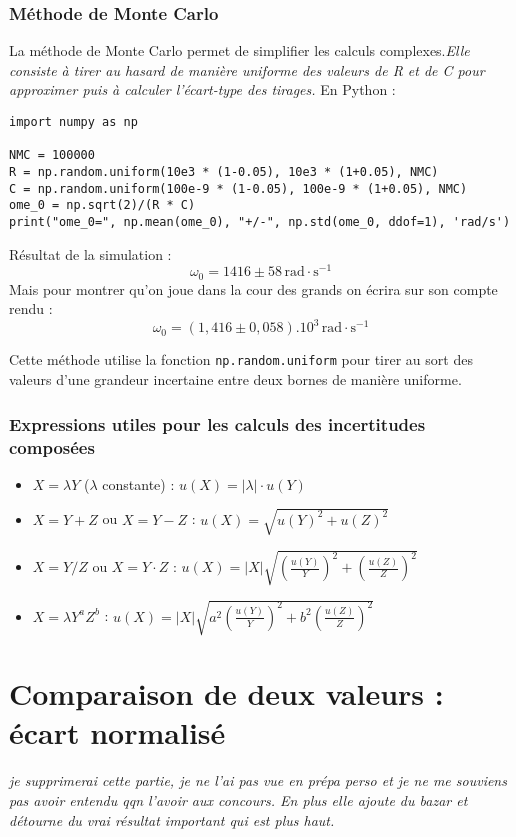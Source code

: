 \documentclass[10pt]{article}
\begin{document}
\begin{multicols}{2}
\subsubsection{Méthode de Monte Carlo}

La méthode de Monte Carlo permet de simplifier les calculs complexes.\textit{Elle consiste à tirer au hasard de manière uniforme des valeurs de R et de C pour approximer puis à calculer l'écart-type des tirages.} En Python :

\begin{verbatim}
import numpy as np

NMC = 100000
R = np.random.uniform(10e3 * (1-0.05), 10e3 * (1+0.05), NMC)
C = np.random.uniform(100e-9 * (1-0.05), 100e-9 * (1+0.05), NMC)
ome_0 = np.sqrt(2)/(R * C)
print("ome_0=", np.mean(ome_0), "+/-", np.std(ome_0, ddof=1), 'rad/s')
\end{verbatim}

Résultat de la simulation :
\[
\omega_0 = 1416 \pm 58 \, \text{rad} \cdot \text{s}^{-1}
\]
Mais pour montrer qu'on joue dans la cour des grands on écrira sur son compte rendu :
\[
\omega_0 = (1,416 \pm 0,058) . 10^3 \, \text{rad} \cdot \text{s}^{-1}
\]

Cette méthode utilise la fonction \texttt{np.random.uniform} pour tirer au sort des valeurs d’une grandeur incertaine entre deux bornes de manière uniforme.

\subsubsection{Expressions utiles pour les calculs des incertitudes composées}

\begin{itemize}
    \item \(X = \lambda Y\) (\(\lambda\) constante) : \(u(X) = |\lambda| \cdot u(Y)\)
    \item \(X = Y + Z\) ou \(X = Y - Z\) : \(u(X) = \sqrt{u(Y)^2 + u(Z)^2}\)
    \item \(X = Y / Z\) ou \(X = Y \cdot Z\) : \(u(X) = |X| \sqrt{\left(\frac{u(Y)}{Y}\right)^2 + \left(\frac{u(Z)}{Z}\right)^2}\)
    \item \(X = \lambda Y^a Z^b\) : \(u(X) = |X| \sqrt{a^2 \left(\frac{u(Y)}{Y}\right)^2 + b^2 \left(\frac{u(Z)}{Z}\right)^2}\)
\end{itemize}

\section{Comparaison de deux valeurs : écart normalisé}
\textit{je supprimerai cette partie, je ne l'ai pas vue en prépa perso et je ne me souviens pas avoir entendu qqn l'avoir aux concours. En plus elle ajoute du bazar et détourne du vrai résultat important qui est plus haut. }


\end{multicols}
\end{document}
